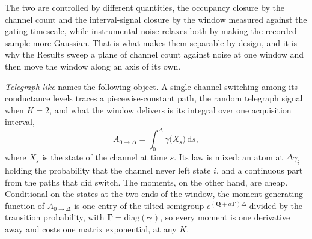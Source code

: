 \begin{tcolorbox}[title={The two Gaussian approximations}, colback=gray!5, colframe=gray!55]
\smallskip
The two are controlled by different quantities, the occupancy closure by the channel count
and the interval-signal closure by the window measured against the gating timescale, while
instrumental noise relaxes both by making the recorded sample more Gaussian. That is what
makes them separable by design, and it is why the Results sweep a plane of channel count
against noise at one window and then move the window along an axis of its own.
\end{tcolorbox}

\emph{Telegraph-like} names the following object. A single channel switching among its
conductance levels traces a piecewise-constant path, the random telegraph signal when
$K=2$, and what the window delivers is its integral over one acquisition interval,
\begin{equation}
  A_{0\to\Delta}=\int_0^{\Delta}\gamma\bigl(X_s\bigr)\,\mathrm{d}s,
  \label{eq:integrated-conductance}
\end{equation}
where $X_s$ is the state of the channel at time $s$. Its law is mixed: an atom at
$\Delta\gamma_i$ holding the probability that the channel never left state $i$, and a
continuous part from the paths that did switch. The moments, on the other hand, are cheap.
Conditional on the states at the two ends of the window, the moment generating function of
$A_{0\to\Delta}$ is one entry of the tilted semigroup $e^{(\mathbf{Q}+\alpha\bm{\Gamma})\Delta}$
divided by the transition probability, with $\bm{\Gamma}=\mathrm{diag}(\bm{\gamma})$, so
every moment is one derivative away and costs one matrix exponential, at any $K$.

